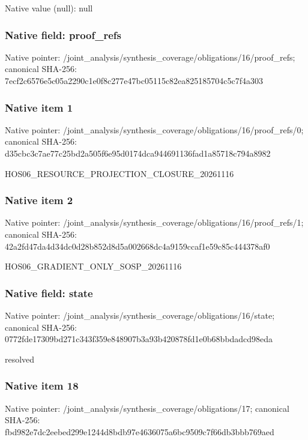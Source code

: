\documentclass[10pt,a4paper]{article}
\begin{document}
Native value (null): null

\subsubsection{Native field: proof\_\allowbreak{}refs}
Native pointer: /joint\_\allowbreak{}analysis/synthesis\_\allowbreak{}coverage/obligations/16/proof\_\allowbreak{}refs; canonical SHA-256: 7ecf2c6576e5c05a2290c1e0f8c277e47bc05115c82ea825185704c5c7f4a303

\subsubsection{Native item 1}
Native pointer: /joint\_\allowbreak{}analysis/synthesis\_\allowbreak{}coverage/obligations/16/proof\_\allowbreak{}refs/0; canonical SHA-256: d35cbc3c7ae77c25bd2a505f6e95d0174dca944691136fad1a85718c794a8982

\begingroup\raggedright\sloppy HOS06\_\allowbreak{}RESOURCE\_\allowbreak{}PROJECTION\_\allowbreak{}CLOSURE\_\allowbreak{}20261116\par\endgroup

\subsubsection{Native item 2}
Native pointer: /joint\_\allowbreak{}analysis/synthesis\_\allowbreak{}coverage/obligations/16/proof\_\allowbreak{}refs/1; canonical SHA-256: 42a2fd47da4d34dc0d28b852d8d5a002668dc4a9159ccaf1e59c85c444378af0

\begingroup\raggedright\sloppy HOS06\_\allowbreak{}GRADIENT\_\allowbreak{}ONLY\_\allowbreak{}SOSP\_\allowbreak{}20261116\par\endgroup

\subsubsection{Native field: state}
Native pointer: /joint\_\allowbreak{}analysis/synthesis\_\allowbreak{}coverage/obligations/16/state; canonical SHA-256: 0772fde17309bd271c343f359e848907b3a93b420878fd1e0b68bbdadcd98eda

\begingroup\raggedright\sloppy resolved\par\endgroup

\subsubsection{Native item 18}
Native pointer: /joint\_\allowbreak{}analysis/synthesis\_\allowbreak{}coverage/obligations/17; canonical SHA-256: fbd982e7dc2eebed299e1244d8bdb97e4636075a6bc9509c7f66db3bbb769aed
\end{document}
